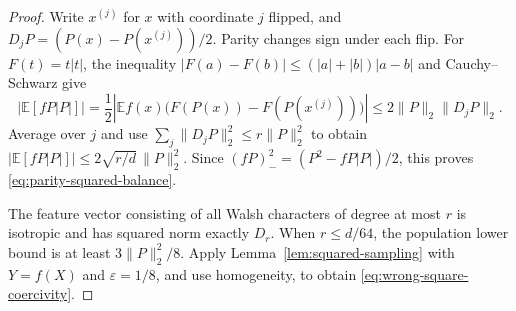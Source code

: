 \begin{proof}
Write $x^{(j)}$ for $x$ with coordinate $j$ flipped, and
$D_jP=(P(x)-P(x^{(j)}))/2$. Parity changes sign under each flip.
For $F(t)=t|t|$, the inequality
$|F(a)-F(b)|\le(|a|+|b|)|a-b|$ and Cauchy--Schwarz give
\[
 \bigl|\mathbb E[fP|P|]\bigr|
 =\frac12\left|\mathbb E f(x)
      \bigl(F(P(x))-F(P(x^{(j)}))\bigr)\right|
 \le2\|P\|_2\|D_jP\|_2.
\]
Average over $j$ and use
$\sum_j\|D_jP\|_2^2\le r\|P\|_2^2$ to obtain
$\bigl|\mathbb E[fP|P|]\bigr|\le2\sqrt{r/d}\,\|P\|_2^2$.
Since $(fP)_-^2=(P^2-fP|P|)/2$, this proves
\eqref{eq:parity-squared-balance}.

The feature vector consisting of all Walsh characters of degree at
most $r$ is isotropic and has squared norm exactly $D_r$.
When $r\le d/64$, the population lower bound is at least
$3\|P\|_2^2/8$. Apply Lemma~\ref{lem:squared-sampling} with
$Y=f(X)$ and $\varepsilon=1/8$, and use homogeneity, to obtain
\eqref{eq:wrong-square-coercivity}.
\end{proof}
